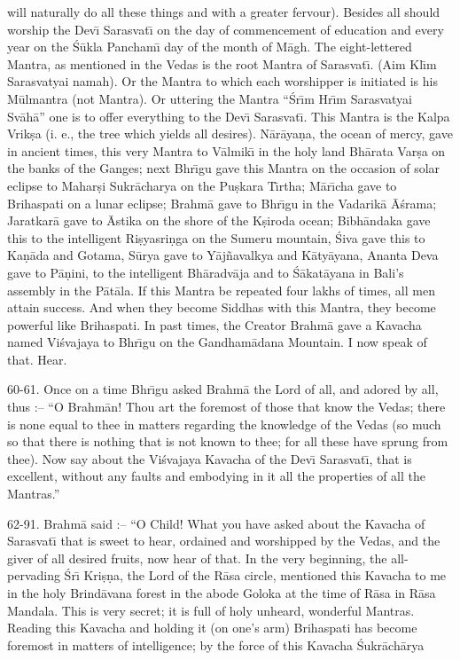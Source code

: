 will naturally do all these things and with a greater fervour). Besides all should worship the Dev\={\i} Sarasvat\={\i} on the day of commencement of education and every year on the \'S\=ukla Pancham\={\i} day of the month of M\=agh. The eight-lettered Mantra, as mentioned in the Vedas is the root Mantra of Sarasvat\={\i}. (Aim Kl\={\i}m Sarasvatyai namah). Or the Mantra to which each worshipper is initiated is his M\=ulmantra (not Mantra). Or uttering the Mantra ``\'Sr\={\i}m Hr\={\i}m Sarasvatyai Sv\=ah\=a'' one is to offer everything to the Dev\={\i} Sarasvat\={\i}. This Mantra is the Kalpa Vrik\d{s}a (i. e., the tree which yields all desires). N\=ar\=aya\d{n}a, the ocean of mercy, gave in ancient times, this very Mantra to V\=almik\={\i} in the holy land Bh\=arata Var\d{s}a on the banks of the Ganges; next Bhr\={\i}gu gave this Mantra on the occasion of solar eclipse to Mahar\d{s}i Sukr\=acharya on the Pu\d{s}kara T\={\i}rtha; M\=ar\={\i}cha gave to Brihaspati on a lunar eclipse; Brahm\=a gave to Bhr\={\i}gu in the Vadarik\=a \=A\'srama; Jaratkar\=a gave to \=Astika on the shore of the K\d{s}iroda ocean; Bibh\=andaka gave this to the intelligent Ri\d{s}yasri\d{n}ga on the Sumeru mountain, \'Siva gave this to Ka\d{n}\=ada and Gotama, S\=urya gave to Y\=aj\~navalkya and K\=aty\=ayana, Ananta Deva gave to P\=a\d{n}ini, to the intelligent Bh\=aradv\=aja and to \'S\=akat\=ayana in Bali's assembly in the P\=at\=ala. If this Mantra be repeated four lakhs of times, all men attain success. And when they become Siddhas with this Mantra, they become powerful like Brihaspati. In past times, the Creator Brahm\=a gave a Kavacha named Vi\'svajaya to Bhr\={\i}gu on the Gandham\=adana Mountain. I now speak of that. Hear.

60-61. Once on a time Bhr\={\i}gu asked Brahm\=a the Lord of all, and adored by all, thus :-- ``O Brahm\=an! Thou art the foremost of those that know the Vedas; there is none equal to thee in matters regarding the knowledge of the Vedas (so much so that there is nothing that is not known to thee; for all these have sprung from thee). Now say about the Vi\'svajaya Kavacha of the Dev\={\i} Sarasvat\={\i}, that is excellent, without any faults and embodying in it all the properties of all the Mantras.''

62-91. Brahm\=a said :-- ``O Child! What you have asked about the Kavacha of Sarasvat\={\i} that is sweet to hear, ordained and worshipped by the Vedas, and the giver of all desired fruits, now hear of that. In the very beginning, the all-pervading \'Sr\={\i} Kri\d{s}\d{n}a, the Lord of the R\=asa circle, mentioned this Kavacha to me in the holy Brind\=avana forest in the abode Goloka at the time of R\=asa in R\=asa Mandala. This is very secret; it is full of holy unheard, wonderful Mantras. Reading this Kavacha and holding it (on one's arm) Brihaspati has become foremost in matters of intelligence; by the force of this Kavacha \'Sukr\=ach\=arya

